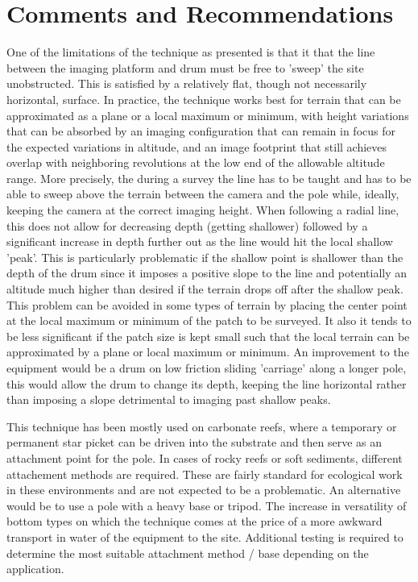 \section{Comments and Recommendations}


One of the limitations of the technique as presented is that it that the line between the imaging platform and drum must be free to 'sweep' the site unobstructed. This is satisfied by a relatively flat, though not necessarily horizontal, surface. In practice, the technique works best for terrain that can be approximated as a plane or a local maximum or minimum, with height variations that can be absorbed by an imaging configuration that can remain in focus for the expected variations in altitude, and an image footprint that still achieves overlap with neighboring revolutions at the low end of the allowable altitude range.
More precisely, the during a survey the line has to be taught and has to be able to sweep above the terrain between the camera and the pole while, ideally, keeping the camera at the correct imaging height. When following a radial line, this does not allow for decreasing depth (getting shallower) followed by a significant increase in depth further out as the line would hit the local shallow 'peak'. This is particularly problematic if the shallow point is shallower than the depth of the drum since it imposes a positive slope to the line and potentially an altitude much higher than desired if the terrain drops off after the shallow peak. This problem can be avoided in some types of terrain by placing the center point at the local maximum or minimum of the patch to be surveyed. It also it tends to be less significant if the patch size is kept small such that the local terrain can be approximated by a plane or local maximum or minimum.
An improvement to the equipment would be a drum on low friction sliding 'carriage' along a longer pole, this would allow the drum to change its depth, keeping the line horizontal rather than imposing a slope detrimental to imaging past shallow peaks.

This technique has been mostly used on carbonate reefs, where a temporary or permanent star picket can be driven into the substrate and then serve as an attachment point for the pole. In cases of rocky reefs or soft sediments, different attachement methods are required. These are fairly standard for ecological work in these environments and are not expected to be a problematic. An alternative would be to use a pole with a heavy base or tripod. The increase in versatility of bottom types on which the technique comes at the price of a more awkward transport in water of the equipment to the site. Additional testing is required to determine the most suitable attachment method / base depending on the application.